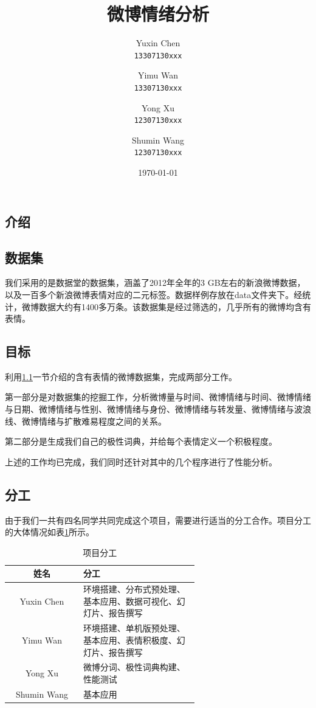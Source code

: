 \documentclass[12pt, oneside]{article}
\title{微博情绪分析}
\author{
	Yuxin Chen\\
	\texttt{13307130xxx}
	\and
	Yimu Wan\\
	\texttt{13307130xxx}
	\and
	Yong Xu\\
	\texttt{12307130xxx}
	\and
	Shumin Wang\\
	\texttt{12307130xxx}
}
\date{\today}
\begin{document}
\begin{spacing}{1.5}
\begin{CJK}{UTF8}{gbsn}

\maketitle

\tableofcontents

\newpage

\section{介绍}
\subsection{数据集}
\label{subsec:dataset}

我们采用的是数据堂的数据集，涵盖了2012年全年的3 GB左右的新浪微博数据，以及一百多个新浪微博表情对应的二元标签。数据样例存放在data文件夹下。经统计，微博数据大约有1400多万条。该数据集是经过筛选的，几乎所有的微博均含有表情。

\subsection{目标}
利用\ref{subsec:dataset}一节介绍的含有表情的微博数据集，完成两部分工作。

第一部分是对数据集的挖掘工作，分析微博量与时间、微博情绪与时间、微博情绪与日期、微博情绪与性别、微博情绪与身份、微博情绪与转发量、微博情绪与波浪线、微博情绪与扩散难易程度之间的关系。

第二部分是生成我们自己的极性词典，并给每个表情定义一个积极程度。

上述的工作均已完成，我们同时还针对其中的几个程序进行了性能分析。

\subsection{分工}

由于我们一共有四名同学共同完成这个项目，需要进行适当的分工合作。项目分工的大体情况如表\ref{tbl:responsibilities}所示。

\begin{table}[]
\centering
\begin{tabular}{|c|p{0.618\linewidth}|}
\hline
姓名          & 分工                              \\ \hline
Yuxin Chen  & 环境搭建、分布式预处理、基本应用、数据可视化、幻灯片、报告撰写 \\ \hline
Yimu Wan    & 环境搭建、单机版预处理、基本应用、表情积极度、幻灯片、报告撰写     \\ \hline
Yong Xu     & 微博分词、极性词典构建、性能测试                     \\ \hline
Shumin Wang & 基本应用                            \\ \hline
\end{tabular}
\caption{项目分工}
\label{tbl:responsibilities}
\end{table}


\end{CJK}
\end{spacing}
\end{document}
